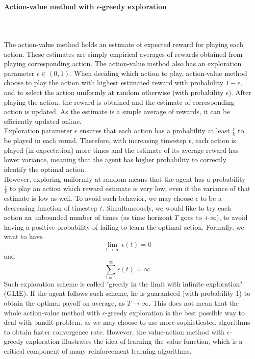 \documentclass{article}
\theoremstyle{remark}
\theoremstyle{definition}
\begin{document}
\paragraph{Action-value method with $\epsilon$-greedy exploration} \mbox{} \\ \\
The action-value method holds an estimate of expected reward for playing each action. These estimates are simply empirical averages of rewards obtained from playing corresponding action. The action-value method also has an exploration parameter $\epsilon \in \left( 0,1\right)$. When deciding which action to play, action-value method choose to play the action with highest estimated reward with probability $1-\epsilon$, and to select the action uniformly at random otherwise (with probability $\epsilon$). After playing the action, the reward is obtained and the estimate of corresponding action is updated. As the estimate is a simple average of rewards, it can be efficiently updated online. \\
Exploration parameter $\epsilon$ ensures that each action has a probability at least $\frac{\epsilon}{k}$ to be played in each round. Therefore, with increasing timestep $t$, each action is played (in expectation) more times and the estimate of its average reward has lower variance, meaning that the agent has higher probability to correctly identify the optimal action. \\
However, exploring uniformly at random means that the agent has a probability $\frac{\epsilon}{k}$ to play an action which reward estimate is very low, even if the variance of that estimate is low as well. To avoid such behavior, we may choose $\epsilon$ to be a decreasing function of timestep $t$. Simultaneously, we would like to try each action an unbounded number of times (as time horizont $T$ goes to $+ \infty$), to avoid having a positive probability of failing to learn the optimal action. Formally, we want to have 
$$
\lim_{t\to\infty} \epsilon(t) = 0
$$
and
$$
\sum_{t=1}^{\infty} \epsilon(t) = \infty
$$
Such exploration scheme is called "greedy in the limit with infinite exploration" (GLIE). If the agent follows such scheme, he is guaranteed (with probability 1) to obtain the optimal payoff on average, as $T \to \infty$. This does not mean that the whole action-value method with $\epsilon$-greedy exploration is the best possible way to deal with bandit problem, as we may choose to use more sophisticated algorithms to obtain faster convergence rate. However, the value-action method with $\epsilon$-greedy exploration illustrates the idea of learning the value function, which is a critical component of many reinforcement learning algorithms.
\end{document}
